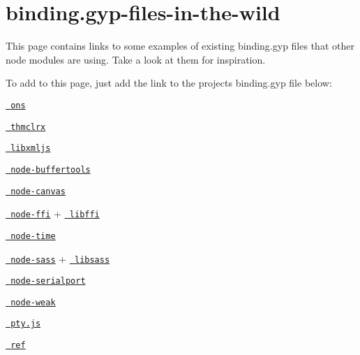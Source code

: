 \chapter{binding.\+gyp-\/files-\/in-\/the-\/wild}
\hypertarget{md_backend_2node__modules_2node-gyp_2docs_2binding_8gyp-files-in-the-wild}{}\label{md_backend_2node__modules_2node-gyp_2docs_2binding_8gyp-files-in-the-wild}
This page contains links to some examples of existing {\ttfamily binding.\+gyp} files that other node modules are using. Take a look at them for inspiration.

To add to this page, just add the link to the project\textquotesingle{}s {\ttfamily binding.\+gyp} file below\+:


\begin{DoxyItemize}
\item \href{https://github.com/XadillaX/aliyun-ons/blob/master/binding.gyp}{\texttt{ ons}}
\item \href{https://github.com/XadillaX/thmclrx/blob/master/binding.gyp}{\texttt{ thmclrx}}
\item \href{https://github.com/polotek/libxmljs/blob/master/binding.gyp}{\texttt{ libxmljs}}
\item \href{https://github.com/bnoordhuis/node-buffertools/blob/master/binding.gyp}{\texttt{ node-\/buffertools}}
\item \href{https://github.com/LearnBoost/node-canvas/blob/master/binding.gyp}{\texttt{ node-\/canvas}}
\item \href{https://github.com/rbranson/node-ffi/blob/master/binding.gyp}{\texttt{ node-\/ffi}} + \href{https://github.com/rbranson/node-ffi/blob/master/deps/libffi/libffi.gyp}{\texttt{ libffi}}
\item \href{https://github.com/TooTallNate/node-time/blob/master/binding.gyp}{\texttt{ node-\/time}}
\item \href{https://github.com/sass/node-sass/blob/master/binding.gyp}{\texttt{ node-\/sass}} + \href{https://github.com/sass/node-sass/blob/master/src/libsass.gyp}{\texttt{ libsass}}
\item \href{https://github.com/voodootikigod/node-serialport/blob/master/binding.gyp}{\texttt{ node-\/serialport}}
\item \href{https://github.com/TooTallNate/node-weak/blob/master/binding.gyp}{\texttt{ node-\/weak}}
\item \href{https://github.com/chjj/pty.js/blob/master/binding.gyp}{\texttt{ pty.\+js}}
\item \href{https://github.com/TooTallNate/ref/blob/master/binding.gyp}{\texttt{ ref}}

\end{DoxyItemize}
